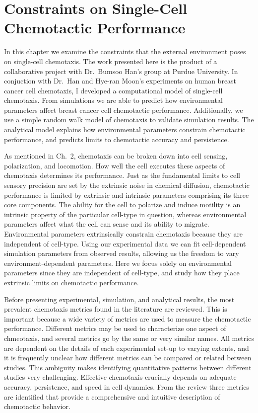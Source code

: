 
\chapter{Constraints on Single-Cell Chemotactic Performance}

\noindent
In this chapter we examine the constraints that the external environment poses on single-cell chemotaxis. The work presented here is the product of a collaborative project with Dr.\ Bumsoo Han's group at Purdue University. In conjuction with Dr.\ Han and Hye-ran Moon's experiments on human breast cancer cell chemotaxis, I developed a computational model of single-cell chemotaxis. From simulations we are able to predict how environmental parameters affect breast cancer cell chemotactic performance. Additionally, we use a simple random walk model of chemotaxis to validate simulation results. The analytical model explains how environmental parameters constrain chemotactic performance, and predicts limits to chemotactic accuracy and persistence.

As mentioned in Ch.\ 2, chemotaxis can be broken down into cell sensing, polarization, and locomotion. How well the cell executes these aspects of chemotaxis determines its performance. Just as the fundamental limits to cell sensory precision are set by the extrinsic noise in chemical diffusion, chemotactic performance is limited by extrinsic and intrinsic parameters comprising its three core components. The ability for the cell to polarize and induce motility is an intrinsic property of the particular cell-type in question, whereas environmental parameters affect what the cell can sense and its ability to migrate. Environmental parameters extrinsically constrain chemotaxis because they are independent of cell-type. Using our experimental data we can fit cell-dependent simulation parameters from observed results, allowing us the freedom to vary environment-dependent parameters. Here we focus solely on environmental parameters since they are independent of cell-type, and study how they place extrinsic limits on chemotactic performance.

Before presenting experimental, simulation, and analytical results, the most prevalent chemotaxis metrics found in the literature are reviewed. This is important because a wide variety of metrics are used to measure the chemotactic performance. Different metrics may be used to characterize one aspect of chmeotaxis, and several metrics go by the same or very similar names. All metrics are dependent on the details of each experimental set-up to varying extents, and it is frequently unclear how different metrics can be compared or related between studies. This ambiguity makes identifying quantitative patterns between different studies very challenging. Effective chemotaxis crucially depends on adequate accuracy, persistence, and speed in cell dynamics. From the review three metrics are identified that provide a comprehensive and intuitive description of chemotactic behavior.

